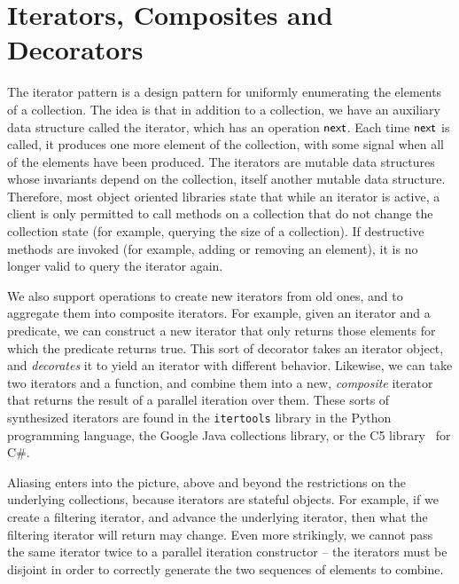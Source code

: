 
\section{Iterators, Composites and Decorators}

The iterator pattern is a design pattern for uniformly enumerating the
elements of a collection. The idea is that in addition to a
collection, we have an auxiliary data structure called the iterator,
which has an operation $\mathsf{next}$. Each time $\mathsf{next}$ is
called, it produces one more element of the collection, with some
signal when all of the elements have been produced. The iterators are
mutable data structures whose invariants depend on the collection,
itself another mutable data structure. Therefore, most object oriented
libraries state that while an iterator is active, a client is only
permitted to call methods on a collection that do not change the
collection state (for example, querying the size of a collection). If
destructive methods are invoked (for example, adding or removing an
element), it is no longer valid to query the iterator again.

We also support operations to create new iterators from old ones, and
to aggregate them into composite iterators. For example, given an
iterator and a predicate, we can construct a new iterator that only
returns those elements for which the predicate returns true. This sort
of decorator takes an iterator object, and \emph{decorates} it to
yield an iterator with different behavior. Likewise, we can take two
iterators and a function, and combine them into a new,
\emph{composite} iterator that returns the result of a parallel
iteration over them.  These sorts of synthesized iterators are found
in the \texttt{itertools} library in the Python programming language,
the Google Java collections library, or the C5 library~\cite{C5} for
C\#.

Aliasing enters into the picture, above and beyond the restrictions on
the underlying collections, because iterators are stateful
objects. For example, if we create a filtering iterator, and advance
the underlying iterator, then what the filtering iterator will return
may change. Even more strikingly, we cannot pass the same iterator
twice to a parallel iteration constructor -- the iterators must be
disjoint in order to correctly generate the two sequences of elements
to combine.

